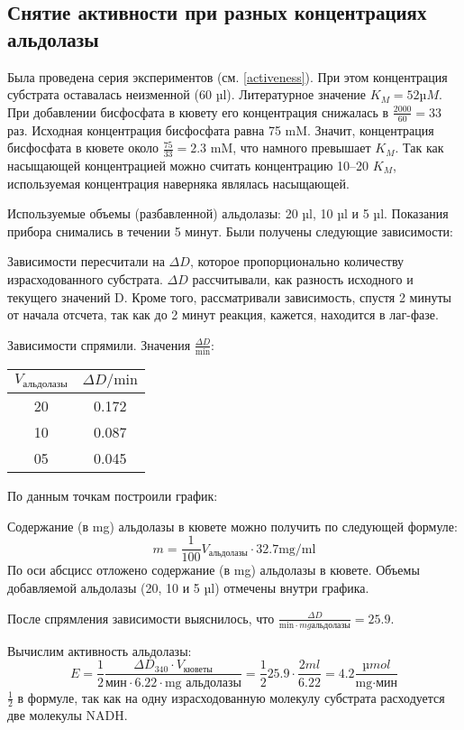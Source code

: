 \subsection{Снятие активности при разных концентрациях альдолазы}
Была проведена серия экспериментов (см. \ref{activeness}).
При этом концентрация субстрата оставалась неизменной (60 µl).
Литературное значение $K_M = 52 µM$.
При добавлении бисфосфата в кювету его концентрация снижалась в $\frac{2000}{60} = 33$ раз.
Исходная концентрация бисфосфата равна 75 mM.
Значит, концентрация бисфосфата в кювете около $\frac{75}{33} = 2.3$ mM,
что намного превышает $K_M$.
Так как насыщающей концентрацией можно считать концентрацию 10--20 $K_M$,
используемая концентрация наверняка являлась насыщающей.

Используемые объемы (разбавленной) альдолазы: 20 µl, 10 µl и 5 µl.
Показания прибора снимались в течении 5 минут.
Были получены следующие зависимости:



Зависимости пересчитали на $\Delta D$, которое пропорционально количеству израсходованного субстрата.
$\Delta D$ рассчитывали, как разность исходного и текущего значений D.
Кроме того, рассматривали зависимость, спустя 2 минуты от начала отсчета,
так как до 2 минут реакция, кажется, находится в лаг-фазе.



Зависимости спрямили. Значения $\frac{\Delta D}{\text{min}}$:

\begin{tabular}{|c|c|}
\hline
$ V_{\text{альдолазы}} $ & $ \Delta D / \text{min} $ \\
\hline
20 & 0.172 \\
10 & 0.087 \\
05 & 0.045 \\
\hline
\end{tabular}

По данным точкам построили график:



Содержание (в mg) альдолазы в кювете можно получить по следующей формуле:
$$ m = \frac{1}{100} V_\text{альдолазы} \cdot 32.7 \text{mg/ml} $$
По оси абсцисс отложено содержание (в mg) альдолазы в кювете.
Объемы добавляемой альдолазы (20, 10 и 5 µl) отмечены внутри графика.

После спрямления зависимости выяснилось, что
$\frac{\Delta D}{\text{min} \cdot {mg альдолазы}} = 25.9$.

Вычислим активность альдолазы:
$$ E = \frac{1}{2} \frac{\Delta D_{340} \cdot V_{кюветы}}{\text{мин} \cdot 6.22 \cdot \text{mg альдолазы}} =
    \frac{1}{2} 25.9 \cdot \frac{2 ml}{6.22} = 4.2 \frac{µmol}{\text{mg} \cdot \text{мин}} $$
$\frac{1}{2}$ в формуле, так как на одну израсходованную молекулу субстрата
расходуется две молекулы NADH.

